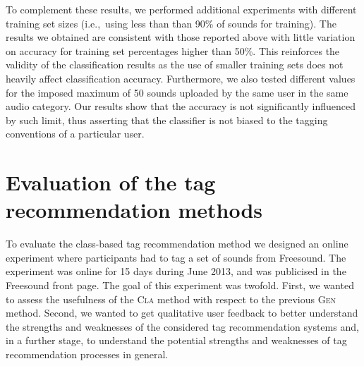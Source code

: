 To complement these results, we performed additional experiments with different training set sizes (i.e.,~using less than than 90\% of sounds for training). The results we obtained are consistent with those reported above with little variation on accuracy for training set percentages higher than 50\%. This reinforces the validity of the classification results as the use of smaller training sets does not heavily affect classification accuracy. Furthermore, we also tested different values for the imposed maximum of 50 sounds uploaded by the same user in the same audio category. Our results show that the accuracy is not significantly influenced by such limit, thus asserting that the classifier is not biased to the tagging conventions of a particular user.%


\section{Evaluation of the tag recommendation methods}
\label{class:sec:evaluation}

To evaluate the class-based tag recommendation method we designed an online experiment where participants had to tag a set of sounds from Freesound. 
The experiment was online for 15 days during June 2013, and was publicised in the Freesound front page. The goal of this experiment was twofold. 
First, we wanted to assess the usefulness of the \textsc{Cla} method with respect to the previous \textsc{Gen} method. 
Second, we wanted to get qualitative user feedback to better understand the strengths and weaknesses of the considered tag recommendation systems and, in a further stage, to understand the potential strengths and weaknesses of tag recommendation processes in general. 

